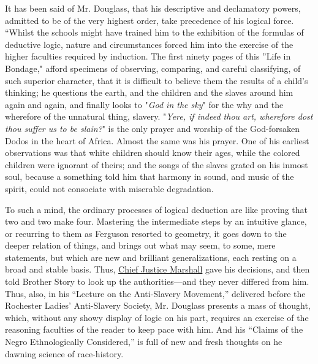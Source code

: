 It has been said of Mr. Douglass, that his descriptive and declamatory
powers, admitted to be of the very highest order, take precedence of his
logical force. ``Whilst the schools might have trained him to the
exhibition of the formulas of deductive logic, nature and circumstances
forced him into the exercise of the higher faculties required by
induction. The first ninety pages of this ''Life in Bondage," afford
specimens of observing, comparing, and careful classifying, of such
superior character, that it is difficult to believe them the results of
a child's thinking; he questions the earth, and the children and the
slaves around him again and again, and finally looks to "\emph{God in
the sky}" for the why and the wherefore of the unnatural thing, slavery.
"\emph{Yere, if indeed thou art, wherefore dost thou suffer us to be
slain?}" is the only prayer and worship of the God-forsaken Dodos in the
heart of Africa. Almost the same was his prayer. One of his earliest
observations was that white children should know their ages, while the
colored children were ignorant of theirs; and the songs of the slaves
grated on his inmost soul, because a something told him that harmony in
sound, and music of the spirit, could not consociate with miserable
degradation.

To such a mind, the ordinary processes of logical deduction are like
proving that two and two make four. Mastering the intermediate steps by
an intuitive glance, or recurring to them as Ferguson resorted to
geometry, it goes down to the deeper relation of things, and brings out
what may seem, to some, mere statements, but which are new and brilliant
generalizations, each resting on a broad and stable basis. Thus,
\href{/wiki/Author:John_Marshall_(1755-1835)}{Chief Justice Marshall}
gave his decisions, and {\protect\hypertarget{xxviii}{}{}}then told
Brother Story to look up the authorities---and they never differed from
him. Thus, also, in his ``Lecture on the Anti-Slavery Movement,''
delivered before the Rochester Ladies' Anti-Slavery Society, Mr.
Douglass presents a mass of thought, which, without any showy display of
logic on his part, requires an exercise of the reasoning faculties of
the reader to keep pace with him. And his ``Claims of the Negro
Ethnologically Considered,'' is full of new and fresh thoughts on he
dawning science of race-history.

